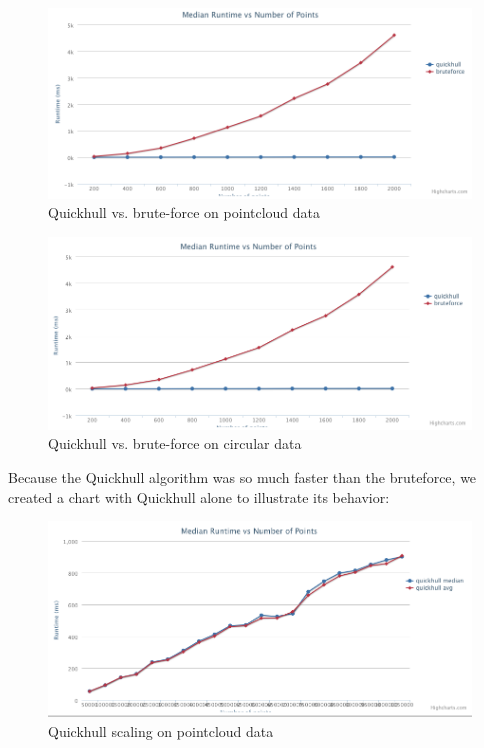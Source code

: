 \documentclass[11pt]{article}
\begin{document}
\begin{figure}
	\caption{Quickhull vs. brute-force on pointcloud data}
	\centering
	\includegraphics[scale=0.3]{qh-v-bf-cloud.png} 
\end{figure}

\begin{figure}
	\caption{Quickhull vs. brute-force on circular data}
	\centering
	\includegraphics[scale=0.3]{qh-v-bf-circle.png} 
\end{figure}

Because the Quickhull algorithm was so much faster than the bruteforce, we created a chart with Quickhull alone to illustrate its behavior:

\begin{figure}
	\caption{Quickhull scaling on pointcloud data}
	\centering
	\includegraphics[scale=0.3]{qh-only.png} 
\end{figure}
\end{document}
